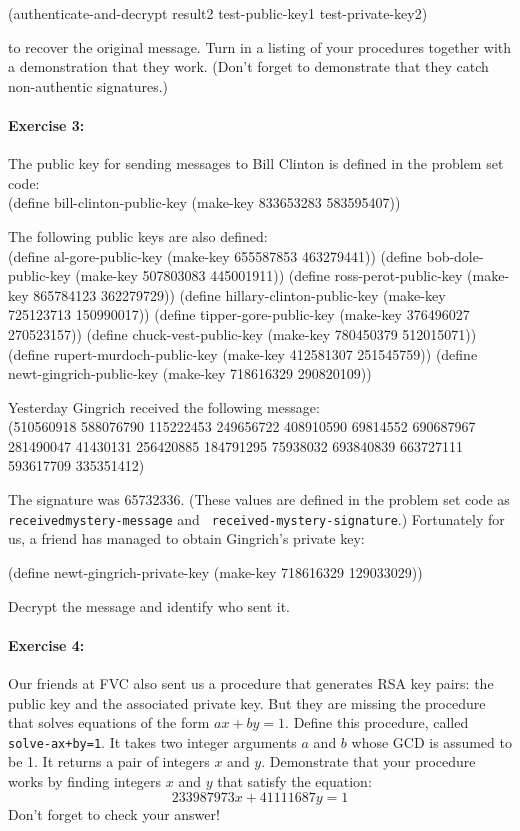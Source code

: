 \beginlisp
(authenticate-and-decrypt result2 test-public-key1 test-private-key2)
\endlisp

\noindent
to recover the original message.  Turn in a listing of your
procedures together with a demonstration that they work. (Don't forget
to demonstrate that they catch non-authentic signatures.)


\paragraph{Exercise 3:}

The public key for sending messages to Bill Clinton is defined in the
problem set code:\\
\beginlisp
(define bill-clinton-public-key (make-key 833653283 583595407))
\endlisp

\noindent
The following public keys are also defined:\\
\beginlisp
(define al-gore-public-key (make-key 655587853 463279441))
(define bob-dole-public-key (make-key 507803083 445001911))
(define ross-perot-public-key (make-key 865784123 362279729))
(define hillary-clinton-public-key (make-key 725123713 150990017))
(define tipper-gore-public-key (make-key 376496027 270523157))
(define chuck-vest-public-key (make-key 780450379 512015071))
(define rupert-murdoch-public-key (make-key 412581307 251545759))
(define newt-gingrich-public-key (make-key 718616329 290820109))
\endlisp

\noindent
Yesterday Gingrich received the following message:\\
\beginlisp
(510560918 588076790 115222453 249656722 408910590 69814552
 690687967 281490047 41430131 256420885 184791295 75938032
 693840839 663727111 593617709 335351412)
\endlisp

\noindent
The signature was 65732336.  (These values are defined in the
problem set code as {\tt received\-mystery-message} and {\tt
received-mystery-signature}.)  Fortunately for us, a friend has
managed to obtain Gingrich's private key:

\beginlisp
(define newt-gingrich-private-key (make-key 718616329 129033029))
\endlisp

\noindent
Decrypt the message and identify who sent it.

\paragraph{Exercise 4:}
Our friends at FVC also sent us a procedure that generates RSA key
pairs: the public key and the associated private key.  But they are
missing the procedure that solves equations of the form $ax+by=1$.
Define this procedure, called {\tt solve-ax+by=1}.  It takes two
integer arguments $a$ and $b$ whose GCD is assumed to be 1.  It
returns a pair of integers $x$ and $y$.  Demonstrate that your
procedure works by finding integers $x$ and $y$ that satisfy the equation:
\[ 233987973x + 41111687y = 1\]
Don't forget to check your answer!

